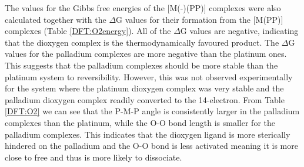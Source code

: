 The values for the Gibbs free energies of the [M(\hapto{}-)(PP)] complexes were also calculated together with the $\Delta$G values for their formation from the [M(PP)] complexes (Table \ref{DFT:O2energy}).  All of the $\Delta$G values are negative, indicating that the dioxygen complex is the thermodynamically favoured product.  The $\Delta$G values for the palladium complexes are more negative than the platinum ones.  This suggests that the palladium complexes should be more stable than the platinum system to reversibility.  However, this was not observed experimentally for the \tButhixantphos{} system where the platinum dioxygen complex was very stable and the palladium dioxygen complex readily converted to the 14-electron.  From Table \ref{DFT:O2} we can see that the P-M-P angle is consistently larger in the palladium complexes than the platinum, while the O-O bond length is smaller for the palladium complexes.  This indicates that the dioxygen ligand is more sterically hindered on the palladium and the O-O bond is less activated meaning it is more close to free  and thus is more likely to dissociate.  

